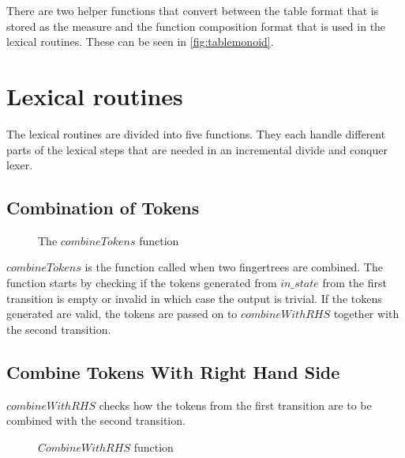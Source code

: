 There are two helper functions that convert between the table format that is
stored as the measure and the function composition format that is used in the
lexical routines. These can be seen in \cref{fig:tablemonoid}.

\section{Lexical routines}
The lexical routines are divided into five functions. They each handle
different parts of the lexical steps that are needed in an incremental divide and
conquer lexer.

%  

\subsection{Combination of Tokens}
\begin{figure}[h!]
  
  \caption{The $combineTokens$ function \label{fig:combinetoks}}
\end{figure}

$combineTokens$ is the function called when two fingertrees are combined.
The function starts by checking if the tokens generated from $in\_state$ from
the first transition is empty or invalid in which case the output is trivial. If
the tokens generated are valid, the tokens are passed on to $combineWithRHS$
together with the second transition.

\subsection{Combine Tokens With Right Hand Side}
$combineWithRHS$ checks how the tokens from the first
transition are to be combined with the second transition.

\begin{figure}[h!]
  
  \caption{$CombineWithRHS$ function\label{fig:cwrhs}}
\end{figure}

